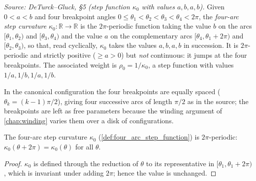 \begin{definition}

  \label{def:four_arc_step_function}
  \textit{Source: DeTurck--Gluck, §5 (step function $\kappa_0$ with values $a,b,a,b$).}
  Given $0 < a < b$ and four breakpoint angles $0 \le \theta_1 < \theta_2 <
  \theta_3 < \theta_4 < 2\pi$, the \emph{four-arc step curvature} $\kappa_0 :
  \mathbb{R} \to \mathbb{R}$ is the $2\pi$-periodic function taking the value $b$
  on the arcs $[\theta_1,\theta_2)$ and $[\theta_3,\theta_4)$ and the value $a$ on
  the complementary arcs $[\theta_4, \theta_1+2\pi)$ and $[\theta_2,\theta_3)$, so
  that, read cyclically, $\kappa_0$ takes the values $a, b, a, b$ in succession.
  It is $2\pi$-periodic and strictly positive ($\ge a > 0$) but \emph{not}
  continuous: it jumps at the four breakpoints. The associated weight is
  $\rho_0 = 1/\kappa_0$, a step function with values $1/a, 1/b, 1/a, 1/b$.

  In the canonical configuration the four breakpoints are equally spaced
  ($\theta_k = (k-1)\pi/2$), giving four successive arcs of length $\pi/2$ as in
  the source; the breakpoints are left as free parameters because the winding
  argument of \cref{chap:winding} varies them over a disk of configurations.
\end{definition}

\begin{lemma}

  \label{lem:step_curvature_periodic}
  The four-arc step curvature $\kappa_0$ (\cref{def:four_arc_step_function}) is
  $2\pi$-periodic: $\kappa_0(\theta + 2\pi) = \kappa_0(\theta)$ for all $\theta$.
\end{lemma}
\begin{proof}
  \leanok
  $\kappa_0$ is defined through the reduction of $\theta$ to its representative in
  $[\theta_1, \theta_1 + 2\pi)$, which is invariant under adding $2\pi$; hence the
  value is unchanged.
\end{proof}

